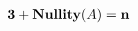 \documentclass[preview]{standalone}
\begin{document}
\begin{align*}
\textbf{\text{3}} + \textbf{\text{Nullity}}(A) = \textbf{n}
\end{align*}
\end{document}
